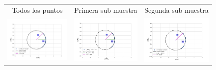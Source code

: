 \begin{figure}
\begin{tabular}{@{}c@{}c@{}c@{}}
 
Todos los puntos & Primera sub-muestra & Segunda sub-muestra \\ \includegraphics[clip]{./Programs/LV-bowshocks-xyfancy-positionswill-177-341} & \includegraphics[clip]{./Programs/Multi-Fit/samp00/LV-bowshocks-xyfancy-positionssamp00-177-341} &
\includegraphics[clip]{./Programs/Multi-Fit/samp01/LV-bowshocks-xyfancy-positionssamp01-177-341} \\

\end{tabular}
\end{figure}
